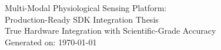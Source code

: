 \documentclass[11pt]{report}
\begin{document}
\begin{titlepage}
	\centering
	{\LARGE Multi-Modal Physiological Sensing Platform:\\[0.5ex]}
	{\LARGE Production-Ready SDK Integration Thesis\\[1ex]}
	{\large True Hardware Integration with Scientific-Grade Accuracy}\\[1ex]
	{\large Generated on: \today}
\end{titlepage}

\tableofcontents
\clearpage








\clearpage
{}
\renewcommand{\bibname}{References}



\appendix
\clearpage









\end{document}
